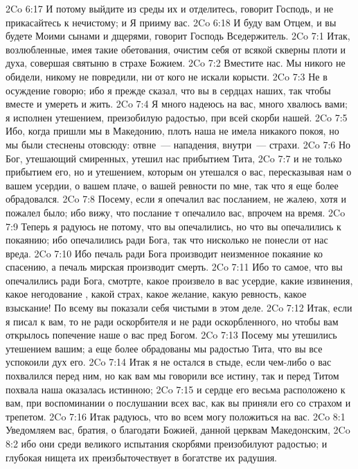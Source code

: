 \vs 2Co 6:17 И потому выйдите из среды их и отделитесь, говорит Господь, и не прикасайтесь к нечистому; и Я прииму вас.
\vs 2Co 6:18 И буду вам Отцем, и вы будете Моими сынами и дщерями, говорит Господь Вседержитель.
\vs 2Co 7:1 Итак, возлюбленные, имея такие обетования, очистим себя от всякой скверны плоти и духа, совершая святыню в страхе Божием.
\rsbpar\vs 2Co 7:2 Вместите нас. Мы никого не обидели, никому не повредили, ни от кого не искали корысти.
\vs 2Co 7:3 Не в осуждение говорю; ибо я прежде сказал, что вы в сердцах наших, так чтобы вместе и умереть и жить.
\vs 2Co 7:4 Я много надеюсь на вас, много хвалюсь вами; я исполнен утешением, преизобилую радостью, при всей скорби нашей.
\vs 2Co 7:5 Ибо, когда пришли мы в Македонию, плоть наша не имела никакого покоя, но мы были стеснены отовсюду: отвне~--- нападения, внутри~--- страхи.
\vs 2Co 7:6 Но Бог, утешающий смиренных, утешил нас прибытием Тита,
\vs 2Co 7:7 и не только прибытием его, но и утешением, которым он утешался о вас, пересказывая нам о вашем усердии, о вашем плаче, о вашей ревности по мне, так что я еще более обрадовался.
\vs 2Co 7:8 Посему, если я опечалил вас посланием, не жалею, хотя и пожалел было; ибо вижу, что послание т опечалило вас, впрочем на время.
\vs 2Co 7:9 Теперь я радуюсь не потому, что вы опечалились, но что вы опечалились к покаянию; ибо опечалились ради Бога, так что нисколько не понесли от нас вреда.
\vs 2Co 7:10 Ибо печаль ради Бога производит неизменное покаяние ко спасению, а печаль мирская производит смерть.
\vs 2Co 7:11 Ибо то самое, что вы опечалились ради Бога, смотрте, какое произвело в вас усердие, какие извинения, какое негодование , какой страх, какое желание, какую ревность, какое взыскание! По всему вы показали себя чистыми в этом деле.
\vs 2Co 7:12 Итак, если я писал к вам, то не ради оскорбителя и не ради оскорбленного, но чтобы вам открылось попечение наше о вас пред Богом.
\vs 2Co 7:13 Посему мы утешились утешением вашим; а еще более обрадованы мы радостью Тита, что вы все успокоили дух его.
\vs 2Co 7:14 Итак я не остался в стыде, если чем-либо о вас похвалился перед ним, но как вам мы говорили все истину, так и перед Титом похвала наша оказалась истинною;
\vs 2Co 7:15 и сердце его весьма расположено к вам, при воспоминании о послушании всех вас, как вы приняли его со страхом и трепетом.
\vs 2Co 7:16 Итак радуюсь, что во всем могу положиться на вас.
\vs 2Co 8:1 Уведомляем вас, братия, о благодати Божией, данной церквам Македонским,
\vs 2Co 8:2 ибо они среди великого испытания скорбями преизобилуют радостью; и глубокая нищета их преизбыточествует в богатстве их радушия.
